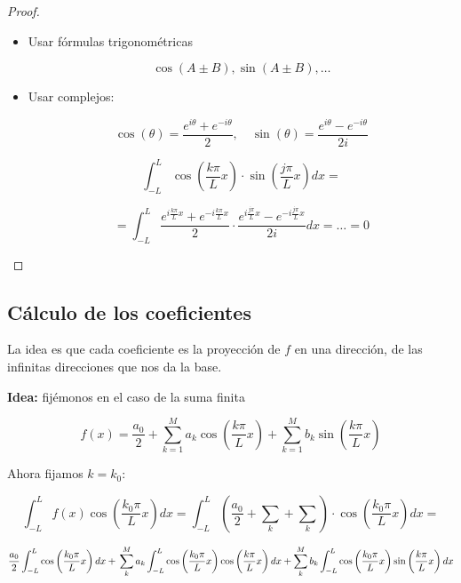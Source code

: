 			\begin{proof}

				\begin{itemize}
					\item Usar fórmulas trigonométricas

						\[\cos(A ± B), \sin(A ± B), …\]

					\item Usar complejos:

						\[ \cos(\theta) = \frac{e^{i\theta} + e^{-i\theta} }{2}, \quad \sin(\theta) = \frac{e^{i\theta} - e^{-i\theta} }{2i}\]

						\[  \int^{L}_{-L} \cos \left( \frac{k \pi}{L} x \right) \cdot \sin \left( \frac{j \pi}{L} x \right) dx = \]

						\[ = \int^L_{-L} \frac{e^{i\frac{k\pi}{L}x} + e^{-i\frac{k\pi}{L}x} }{2} \cdot \frac{e^{i\frac{j\pi}{L}x} - e^{-i\frac{j\pi}{L}x} }{2i} dx = … = 0 \]

				\end{itemize}

			\end{proof}




	\subsection{Cálculo de los coeficientes}

		La idea es que cada coeficiente es la proyección de $f$ en una dirección, de las infinitas direcciones que nos da la base.

		\textbf{Idea:} fijémonos en el caso de la suma finita

		\[ f(x) = \frac{a_0}{2}+ \sum_{k=1}^M a_k \cos \left( \frac{k \pi}{L} x \right) + \sum_{k=1}^M b_k \sin \left( \frac{k \pi}{L} x \right)\]

		Ahora fijamos $k=k_0$:

		\[ \int^L_{-L} f(x) \cos \left( \frac{k_0 \pi}{L} x \right) dx = \int^L_{-L} (\frac{a_0}{2} + \sum_k + \sum_k ) \cdot  \cos \left( \frac{k_0 \pi}{L} x \right) dx  = \]

		\[ \frac{a_0}{2}  \int^L_{-L} \cos \left( \frac{k_0 \pi}{L} x \right) dx +\\
		\sum_k^M a_k \int^L_{-L} \cos \left( \frac{k_0 \pi}{L} x \right) \cos \left( \frac{k \pi}{L} x \right) dx +
		\sum_k^M b_k \int^L_{-L} \cos \left( \frac{k_0 \pi}{L} x \right) \sin \left( \frac{k \pi}{L} x \right) dx \]

